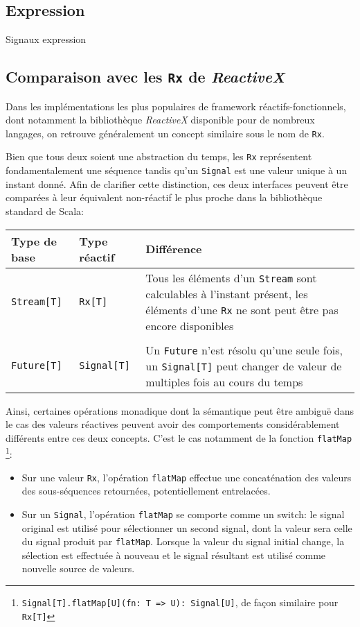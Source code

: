 \subsection{Expression}

Signaux expression

\subsection{Comparaison avec les \texttt{Rx} de \emph{ReactiveX}}

Dans les implémentations les plus populaires de framework réactifs-fonctionnels, dont notamment la bibliothèque \emph{ReactiveX} disponible pour de nombreux langages, on retrouve généralement un concept similaire sous le nom de \texttt{Rx}.

Bien que tous deux soient une abstraction du temps, les \texttt{Rx} représentent fondamentalement une séquence tandis qu'un \texttt{Signal} est une valeur unique à un instant donné. Afin de clarifier cette distinction, ces deux interfaces peuvent être comparées à leur équivalent non-réactif le plus proche dans la bibliothèque standard de Scala:

\begin{table}[H]
	\begin{tabular}{@{}p{2.5cm}p{2.5cm}p{\dimexpr\textwidth-6cm\relax}@{}}
		\toprule
		Type de base & Type réactif & Différence \\ \midrule
		\texttt{Stream[T]} & \texttt{Rx[T]} & Tous les éléments d'un \texttt{Stream} sont calculables à l'instant présent, les éléments d'une \texttt{Rx} ne sont peut être pas encore disponibles \\
		&  & \\
		\texttt{Future[T]} & \texttt{Signal[T]} & Un \texttt{Future} n'est résolu qu'une seule fois, un \texttt{Signal[T]} peut changer de valeur de multiples fois au cours du temps \\ \bottomrule
	\end{tabular}
\end{table}

Ainsi, certaines opérations monadique dont la sémantique peut être ambiguë dans le cas des valeurs réactives peuvent avoir des comportements considérablement différents entre ces deux concepts. C'est le cas notamment de la fonction \texttt{flatMap}
\footnote{\texttt{Signal[T].flatMap[U](fn: T => U): Signal[U]}, de façon similaire pour \texttt{Rx[T]}}:

\begin{itemize}
	\item Sur une valeur \texttt{Rx}, l'opération \texttt{flatMap} effectue une concaténation des valeurs des sous-séquences retournées, potentiellement entrelacées.
	\item Sur un \texttt{Signal}, l'opération \texttt{flatMap} se comporte comme un switch: le signal original est utilisé pour sélectionner un second signal, dont la valeur sera celle du signal produit par \texttt{flatMap}. Lorsque la valeur du signal initial change, la sélection est effectuée à nouveau et le signal résultant est utilisé comme nouvelle source de valeurs.
\end{itemize}


